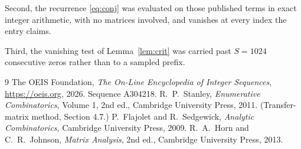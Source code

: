 \documentclass[11pt,a4paper]{article}
\theoremstyle{plain}
\theoremstyle{definition}
\begin{document}
Second, the recurrence \eqref{eq:conj} was evaluated on those published terms in exact
integer arithmetic, with no matrices involved, and vanishes at every index the entry claims.

Third, the vanishing test of Lemma~\ref{lem:crit} was carried past $S=1024$ consecutive
zeros rather than to a sampled prefix.

\begin{thebibliography}{9}
 The OEIS Foundation, \emph{The On-Line Encyclopedia of Integer
Sequences}, \url{https://oeis.org}, 2026. Sequence A304218.
 R.~P.~Stanley, \emph{Enumerative Combinatorics}, Volume 1, 2nd ed.,
Cambridge University Press, 2011. (Transfer-matrix method, Section 4.7.)
 P.~Flajolet and R.~Sedgewick, \emph{Analytic Combinatorics}, Cambridge
University Press, 2009.
 R.~A.~Horn and C.~R.~Johnson, \emph{Matrix Analysis}, 2nd ed., Cambridge
University Press, 2013.
\end{thebibliography}
\end{document}
